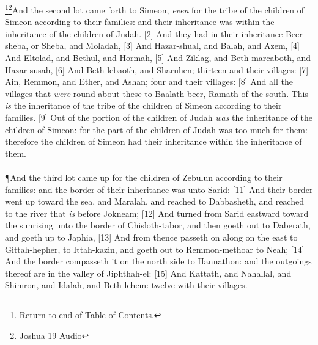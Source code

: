 \footnote{\textcolor[rgb]{0.00,0.25,0.00}{\hyperlink{TOC}{Return to end of Table of Contents.}}}\footnote{\href{https://audiobible.com/bible/joshua_19.html}{\textcolor[cmyk]{0.99998,1,0,0}{Joshua 19 Audio}}}\textcolor[cmyk]{0.99998,1,0,0}{And the second lot came forth to Simeon, \emph{even} for the tribe of the children of Simeon according to their families: and their inheritance was within the inheritance of the children of Judah.}
[2] \textcolor[cmyk]{0.99998,1,0,0}{And they had in their inheritance Beer-sheba, or Sheba, and Moladah,}
[3] \textcolor[cmyk]{0.99998,1,0,0}{And Hazar-shual, and Balah, and Azem,}
[4] \textcolor[cmyk]{0.99998,1,0,0}{And Eltolad, and Bethul, and Hormah,}
[5] \textcolor[cmyk]{0.99998,1,0,0}{And Ziklag, and Beth-marcaboth, and Hazar-susah,}
[6] \textcolor[cmyk]{0.99998,1,0,0}{And Beth-lebaoth, and Sharuhen; thirteen  and their villages:}
[7] \textcolor[cmyk]{0.99998,1,0,0}{Ain, Remmon, and Ether, and Ashan; four  and their villages:}
[8] \textcolor[cmyk]{0.99998,1,0,0}{And all the villages that \emph{were} round about these  to Baalath-beer, Ramath of the south. This \emph{is} the inheritance of the tribe of the children of Simeon according to their families.}
[9] \textcolor[cmyk]{0.99998,1,0,0}{Out of the portion of the children of Judah \emph{was} the inheritance of the children of Simeon: for the part of the children of Judah was too much for them: therefore the children of Simeon had their inheritance within the inheritance of them.}\\
\\
\P \textcolor[cmyk]{0.99998,1,0,0}{And the third lot came up for the children of Zebulun according to their families: and the border of their inheritance was unto Sarid:}
[11] \textcolor[cmyk]{0.99998,1,0,0}{And their border went up toward the sea, and Maralah, and reached to Dabbasheth, and reached to the river that \emph{is} before Jokneam;}
[12] \textcolor[cmyk]{0.99998,1,0,0}{And turned from Sarid eastward toward the sunrising unto the border of Chisloth-tabor, and then goeth out to Daberath, and goeth up to Japhia,}
[13] \textcolor[cmyk]{0.99998,1,0,0}{And from thence passeth on along on the east to Gittah-hepher, to Ittah-kazin, and goeth out to Remmon-methoar to Neah;}
[14] \textcolor[cmyk]{0.99998,1,0,0}{And the border compasseth it on the north side to Hannathon: and the outgoings thereof are in the valley of Jiphthah-el:}
[15] \textcolor[cmyk]{0.99998,1,0,0}{And Kattath, and Nahallal, and Shimron, and Idalah, and Beth-lehem: twelve  with their villages.}
